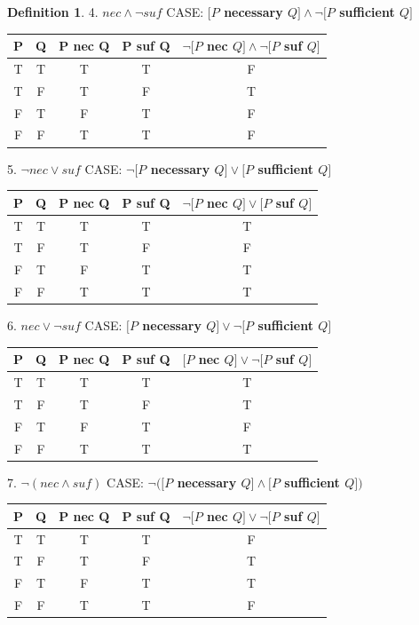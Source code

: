 \documentclass{book}
\theoremstyle{definition}
\newtheorem{definition}{Definition}[section]
\theoremstyle{remark}
\begin{document}
\begin{definition}
4. $nec \wedge \neg suf$ CASE: {\bf $[P$ necessary $Q] \wedge \neg[P$ sufficient $Q]$} \\
\begin{center}
\begin{tabular}{|c|c|c|c|c|}
\hline 
P & Q & P nec Q & P suf Q & $\neg[P$ nec $Q] \wedge \neg[P$ suf $Q]$  \\ 
\hline 
T & T & T & T & F\\ 
\hline 
T & F & T & F & T\\ 
\hline 
F & T & F & T & F\\ 
\hline 
F & F & T & T & F\\ 
\hline 
\end{tabular} 
\end{center}

5. $\neg nec \vee suf$ CASE: {\bf $\neg[P$ necessary $Q] \vee [P$ sufficient $Q]$} \\
\begin{center}
\begin{tabular}{|c|c|c|c|c|}
\hline 
P & Q & P nec Q & P suf Q & $\neg[P$ nec $Q] \vee [P$ suf $Q]$  \\ 
\hline 
T & T & T & T & T\\ 
\hline 
T & F & T & F & F\\ 
\hline 
F & T & F & T & T\\ 
\hline 
F & F & T & T & T\\ 
\hline 
\end{tabular} 
\end{center}


6. $nec \vee \neg suf$ CASE: {\bf $[P$ necessary $Q] \vee \neg[P$ sufficient $Q]$} \\
\begin{center}
\begin{tabular}{|c|c|c|c|c|}
\hline 
P & Q & P nec Q & P suf Q & $[P$ nec $Q] \vee \neg[P$ suf $Q]$  \\ 
\hline 
T & T & T & T & T\\ 
\hline 
T & F & T & F & T\\ 
\hline 
F & T & F & T & F\\ 
\hline 
F & F & T & T & T\\ 
\hline 
\end{tabular} 
\end{center}


7. $\neg(nec \wedge suf)$ CASE: {\bf $\neg([P$ necessary $Q] \wedge [P$ sufficient $Q])$} \\
\begin{center}
\begin{tabular}{|c|c|c|c|c|}
\hline 
P & Q & P nec Q & P suf Q & $\neg[P$ nec $Q] \vee \neg[P$ suf $Q]$  \\ 
\hline 
T & T & T & T & F\\ 
\hline 
T & F & T & F & T\\ 
\hline 
F & T & F & T & T\\ 
\hline 
F & F & T & T & F\\ 
\hline 
\end{tabular} 
\end{center}


\end{definition}
\end{document}

